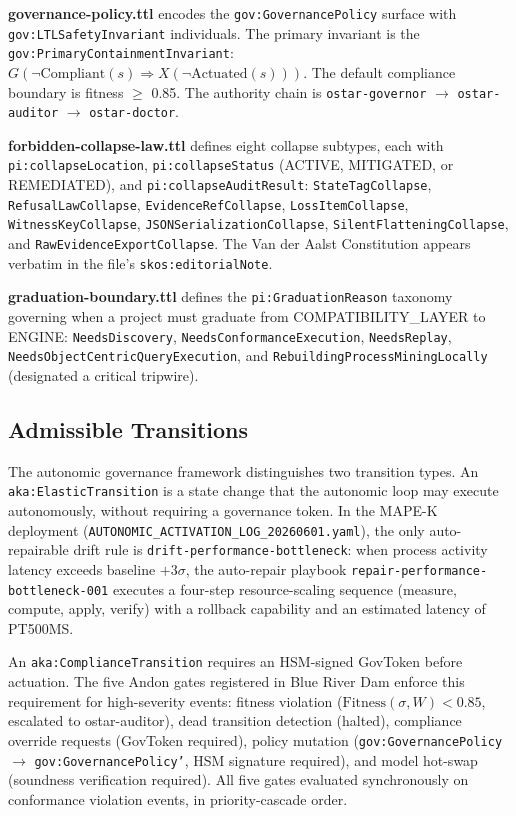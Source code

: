\textbf{governance-policy.ttl} encodes the \texttt{gov:GovernancePolicy} surface with \texttt{gov:LTLSafetyInvariant} individuals. The primary invariant is the \texttt{gov:PrimaryContainmentInvariant}: \( G(\lnot\mathrm{Compliant}(s) \Rightarrow X(\lnot\mathrm{Actuated}(s))) \). The default compliance boundary is fitness $\geq$ 0.85. The authority chain is \texttt{ostar-governor} $\to$ \texttt{ostar-auditor} $\to$ \texttt{ostar-doctor}.

\textbf{forbidden-collapse-law.ttl} defines eight collapse subtypes, each with \texttt{pi:collapseLocation}, \texttt{pi:collapseStatus} (ACTIVE, MITIGATED, or REMEDIATED), and \texttt{pi:collapseAuditResult}: \texttt{StateTagCollapse}, \texttt{RefusalLawCollapse}, \texttt{EvidenceRefCollapse}, \texttt{LossItemCollapse}, \texttt{WitnessKeyCollapse}, \texttt{JSONSerializationCollapse}, \texttt{SilentFlatteningCollapse}, and \texttt{RawEvidenceExportCollapse}. The Van der Aalst Constitution appears verbatim in the file's \texttt{skos:editorialNote}.

\textbf{graduation-boundary.ttl} defines the \texttt{pi:GraduationReason} taxonomy governing when a project must graduate from COMPATIBILITY\_LAYER to ENGINE: \texttt{NeedsDiscovery}, \texttt{NeedsConformanceExecution}, \texttt{NeedsReplay}, \texttt{NeedsObjectCentricQueryExecution}, and \texttt{RebuildingProcessMiningLocally} (designated a critical tripwire).

\subsection{Admissible Transitions}
\label{sec:research-pi-program-arch-transitions}

The autonomic governance framework distinguishes two transition types. An \texttt{aka:ElasticTransition} is a state change that the autonomic loop may execute autonomously, without requiring a governance token. In the MAPE-K deployment (\texttt{AUTONOMIC\_ACTIVATION\_LOG\_20260601.yaml}), the only auto-repairable drift rule is \texttt{drift-performance-bottleneck}: when process activity latency exceeds baseline $+ 3\sigma$, the auto-repair playbook \texttt{repair-performance-bottleneck-001} executes a four-step resource-scaling sequence (measure, compute, apply, verify) with a rollback capability and an estimated latency of PT500MS.

An \texttt{aka:ComplianceTransition} requires an HSM-signed GovToken before actuation. The five Andon gates registered in Blue River Dam enforce this requirement for high-severity events: fitness violation ($\mathrm{Fitness}(\sigma, W) < 0.85$, escalated to ostar-auditor), dead transition detection (halted), compliance override requests (GovToken required), policy mutation (\texttt{gov:GovernancePolicy} $\to$ \texttt{gov:GovernancePolicy'}, HSM signature required), and model hot-swap (soundness verification required). All five gates evaluated synchronously on conformance violation events, in priority-cascade order.

